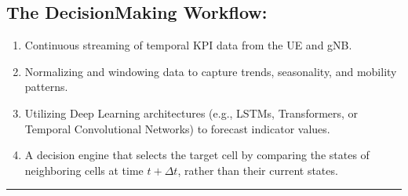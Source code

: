 \documentclass[letterpaper,10pt,english]{sphinxmanual}
\begin{document}
\subsection{The Decision\sphinxhyphen{}Making Workflow:}
\label{\detokenize{overview:the-decision-making-workflow}}\begin{enumerate}
%
\item {} 
\sphinxAtStartPar
{} Continuous streaming of temporal KPI data from the UE and gNB.

\item {} 
\sphinxAtStartPar
{} Normalizing and windowing data to capture trends, seasonality, and mobility patterns.

\item {} 
\sphinxAtStartPar
{} Utilizing Deep Learning architectures (e.g., LSTMs, Transformers, or Temporal Convolutional Networks) to forecast indicator values.

\item {} 
\sphinxAtStartPar
{} A decision engine that selects the target cell by comparing the  states of neighboring cells at time \(t + \Delta t\), rather than their current states.

\end{enumerate}


\bigskip\hrule\bigskip
\end{document}
